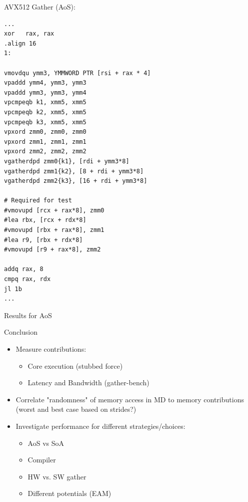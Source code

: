\documentclass[aspectratio=169,t]{beamer}
\begin{document}
  \begin{frame}[fragile]{AVX512 Gather (AoS):}
    \vspace{-17.5pt}
    \begin{lstlisting}[language={[x64]Assembler},basicstyle=\tt\tiny]
...
xor   rax, rax
.align 16
1:

vmovdqu ymm3, YMMWORD PTR [rsi + rax * 4]
vpaddd ymm4, ymm3, ymm3
vpaddd ymm3, ymm3, ymm4
vpcmpeqb k1, xmm5, xmm5
vpcmpeqb k2, xmm5, xmm5
vpcmpeqb k3, xmm5, xmm5
vpxord zmm0, zmm0, zmm0
vpxord zmm1, zmm1, zmm1
vpxord zmm2, zmm2, zmm2
vgatherdpd zmm0{k1}, [rdi + ymm3*8]
vgatherdpd zmm1{k2}, [8 + rdi + ymm3*8]
vgatherdpd zmm2{k3}, [16 + rdi + ymm3*8]

# Required for test
#vmovupd [rcx + rax*8], zmm0
#lea rbx, [rcx + rdx*8]
#vmovupd [rbx + rax*8], zmm1
#lea r9, [rbx + rdx*8]
#vmovupd [r9 + rax*8], zmm2

addq rax, 8
cmpq rax, rdx
jl 1b
...
    \end{lstlisting}
  \end{frame}

  \begin{frame}[fragile]{Results for AoS}
  \end{frame}

  \begin{frame}[fragile]{Conclusion}
    \begin{itemize}
      \item Measure contributions:
      \begin{itemize}
        \item Core execution (stubbed force)
        \item Latency and Bandwidth (gather-bench)
      \end{itemize}
      \item Correlate "randomness" of memory access in MD to memory contributions (worst and best case based on strides?)
      \item Investigate performance for different strategies/choices:
      \begin{itemize}
        \item AoS vs SoA
        \item Compiler
        \item HW vs. SW gather
        \item Different potentials (EAM)
      \end{itemize}
    \end{itemize}
  \end{frame}
\end{document}
